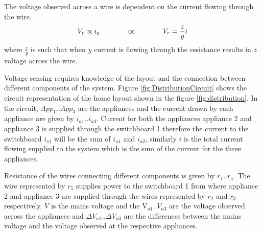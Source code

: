 The voltage observed across a wire is dependent on the current flowing through the wire.
\begin{equation}
\label{eq:voltageeq}
V_r \propto i_a \hspace{0.5in} \text{ or } \hspace{0.5in}V_r = \frac{z}{y} i
\end{equation}
where $\frac{z}{y}$ is such that when $y$ current is flowing through the resistance results in $z$ voltage across the wire.




Voltage sensing requires knowledge of the layout and the connection between different components of the system.
Figure \ref{fig:DistributionCircuit} shows the circuit representation of the home layout shown in the figure \ref{fig:distribution}.
In the circuit, $App_{1} .. App_{3}$ are the appliances and the current drawn by each appliance are given by $i_{a1} .. i_{a3}$. Current for both the appliances appliance 2 and appliance 3 is supplied through the switchboard 1 therefore the current to the switchboard $i_{s1}$ will be the sum of $i_{a1}$ and $i_{a2}$, similarly $i$ is the total current flowing supplied to the system which is the sum of the current for the three appliances.

Resistance of the wires connecting different components is given by $r_{1} .. r_{5}$. The wire represented by $r_{5}$ supplies power to the switchboard 1 from where appliance 2 and appliance 3 are supplied through the wires represented by $r_{2}$ and $r_{3}$ respectively. $V$ is the mains voltage and the V$_{a1} .. V_{a3}$ are the voltage observed across the appliances and $\Delta V_{a1}.. \Delta V_{a3}$ are the differences between the mains voltage and the voltage observed at the respective appliances.

